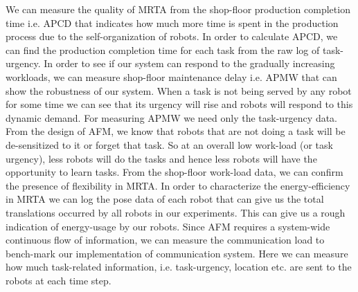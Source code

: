\documentclass[journal]{IEEEtran}
\begin{document}
We can measure the quality of MRTA from the shop-floor production completion time i.e. APCD that indicates how much more time is  spent in the production process due to the self-organization of robots.  In order to calculate APCD, we can find the production completion time for each task from the raw log of task-urgency.
%
In order to see if our system can respond to the gradually increasing workloads,  we can measure shop-floor maintenance delay i.e. APMW that can show the robustness of our system. When a task is not being served by any robot for some time we can see that its urgency will rise and robots will respond to this dynamic demand. For measuring APMW we need only the task-urgency data.
%
From the design of AFM, we know that robots that are not doing a task will be de-sensitized to it or forget that task. So at an overall low work-load (or task urgency), less robots will do the tasks and hence less robots will have the opportunity to learn tasks. From the shop-floor work-load data, we can confirm the presence of flexibility in MRTA.
%
In order to characterize the energy-efficiency in MRTA we can log the pose data of each robot that can give us the total translations occurred by all robots in our experiments. This can give us a rough indication of energy-usage by our robots. 
%
Since AFM requires a system-wide continuous flow of information, we can measure the communication load to bench-mark our implementation of communication system. Here we can measure  how much task-related information, i.e. task-urgency, location etc. are sent to the robots at each time step. 
%
\end{document}
